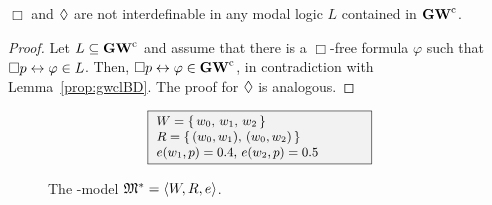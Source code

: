 \begin{proposition}\label{prop:defBD}
  $\Box$ and $\lozenge$ are not interdefinable in any modal logic $L$
  contained in $\mathbf{GW}^\mathrm{c}$.
\end{proposition}  

\begin{proof}
  Let $L\subseteq \mathbf{GW}^\mathrm{c}$ and assume
  that  there is
  a $\Box$-free formula $\varphi$ such that $\Box p\leftrightarrow\varphi\in
  L$. Then, $\Box p\leftrightarrow\varphi\in \mathbf{GW}^\mathrm{c}$,
  in contradiction with Lemma~\ref{prop:gwclBD}.  The proof for
  $\lozenge$ is analogous.
\end{proof}

\begin{figure}[t]
  \centering
  \begin{minipage}{0.45\linewidth}
  \end{minipage}
  \begin{minipage}{0.5\linewidth}
    \[\small
    \begin{array}{l}
      \fcolorbox{black}{gray!10}{
        \begin{minipage}{16em}\small
          $W=\{\,w_0,\,w_1,\,w_2\,\}$
          \\
          $R =\{\,(w_0,w_1),\,(w_0,w_2)\,\}$
          \\
          $e(w_1,p) = 0.4,\,e(w_2,p) = 0.5$  
        \end{minipage}
      } %
    \end{array}
    \]
  \end{minipage}
  \caption{The \GWCM-model  $\mathfrak{M}^\ast=\langle W,R,e \rangle$.}
  \label{fig:ind}
\end{figure}
  







